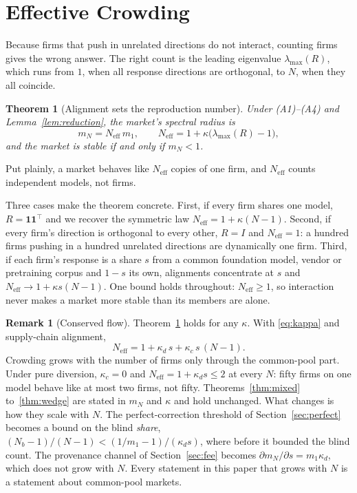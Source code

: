 \documentclass[conference]{IEEEtran}
\newtheorem{theorem}{Theorem}
\theoremstyle{definition}
\newtheorem{remark}{Remark}
\newcommand{\Neff}{N_{\mathrm{eff}}}
\newcommand{\lmax}{\lambda_{\max}}
\newcommand{\ones}{\mathbf{1}\mathbf{1}^{\top}}
\begin{document}
\section{Effective Crowding}\label{sec:crowd}
Because firms that push in unrelated directions do not interact, counting
firms gives the wrong answer. The right count is the leading eigenvalue
$\lmax(R)$, which runs from $1$, when all response directions are orthogonal,
to $N$, when they all coincide.

\begin{theorem}[Alignment sets the reproduction number]\label{thm:align}
Under (A1)--(A4) and Lemma~\ref{lem:reduction}, the market's spectral radius
is
\begin{equation}
  m_N = \Neff\, m_1, \qquad
  \Neff = 1 + \kappa\bigl(\lmax(R) - 1\bigr),
  \label{eq:mn}
\end{equation}
and the market is stable if and only if $m_N < 1$.
\end{theorem}

Put plainly, a market behaves like $\Neff$ copies of one firm, and $\Neff$
counts independent models, not firms.

Three cases make the theorem concrete. First, if every firm shares one model,
$R = \ones$ and we recover the symmetric law $\Neff = 1 + \kappa(N-1)$.
Second, if every firm's direction is orthogonal to every other, $R = I$ and
$\Neff = 1$: a hundred firms pushing in a hundred unrelated directions are
dynamically one firm. Third, if each firm's response is a share $s$ from a
common foundation model, vendor or pretraining corpus and $1-s$ its own,
alignments concentrate at $s$ and $\Neff \to 1 + \kappa s(N-1)$. One bound
holds throughout: $\Neff \ge 1$, so interaction never makes a market more
stable than its members are alone.

\begin{remark}[Conserved flow]\label{rem:conserved}
Theorem~\ref{thm:align} holds for any $\kappa$. With \eqref{eq:kappa} and
supply-chain alignment,
\begin{equation}
  \Neff = 1 + \kappa_d\,s + \kappa_c\,s\,(N-1).
  \label{eq:neffsplit}
\end{equation}
Crowding grows with the number of firms only through the common-pool part.
Under pure diversion, $\kappa_c = 0$ and $\Neff = 1 + \kappa_d s \le 2$ at
every $N$: fifty firms on one model behave like at most two firms, not fifty. Theorems~\ref{thm:mixed} to~\ref{thm:wedge} are stated in $m_N$ and
$\kappa$ and hold unchanged. What changes is how they scale with $N$. The
perfect-correction threshold of Section~\ref{sec:perfect} becomes a bound on
the blind \emph{share}, $(N_b-1)/(N-1) < (1/m_1-1)/(\kappa_d s)$, where before
it bounded the blind count. The provenance channel of Section~\ref{sec:fee}
becomes $\partial m_N/\partial s = m_1\kappa_d$, which does not grow with $N$.
Every statement in this paper that grows with $N$ is a statement about
common-pool markets.
\end{remark}
\end{document}
